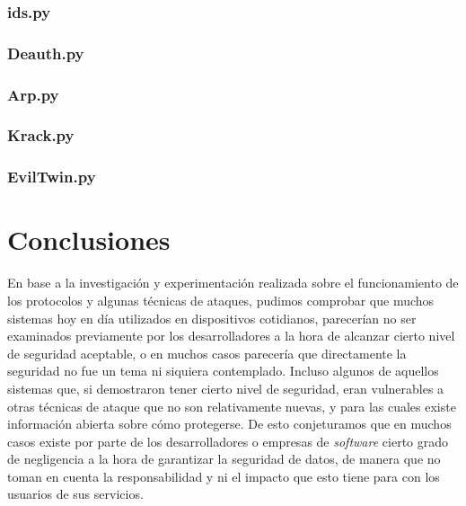 \documentclass[10pt,a4paper]{article}
\begin{document}
\subsubsection{ids.py}


\subsubsection{Deauth.py}


\subsubsection{Arp.py}

\newpage
\subsubsection{Krack.py}


\subsubsection{EvilTwin.py}


\section{Conclusiones}

En base a la investigación y experimentación realizada sobre el funcionamiento de los protocolos y algunas técnicas de ataques, pudimos comprobar que muchos sistemas hoy en día utilizados en dispositivos cotidianos, parecerían no ser examinados previamente por los desarrolladores a la hora de alcanzar cierto nivel de seguridad aceptable, o en muchos casos parecería que directamente la seguridad no fue un tema ni siquiera contemplado. Incluso algunos de aquellos sistemas que, si demostraron tener cierto nivel de seguridad, eran vulnerables a otras técnicas de ataque que no son relativamente nuevas, y para las cuales existe información abierta sobre cómo protegerse. De esto conjeturamos que en muchos casos existe por parte de los desarrolladores o empresas de \textit{software} cierto grado de negligencia a la hora de garantizar la seguridad de datos, de manera que no toman en cuenta la responsabilidad y ni el impacto que esto tiene para con los usuarios de sus servicios. 
\end{document}
